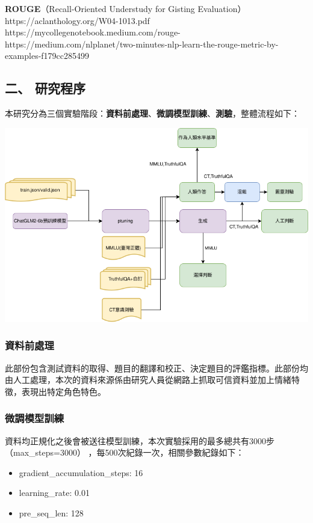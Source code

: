 \documentclass[8pt,a4paper,新細明體,UTF8,natbib]{article}
\begin{document}
\begin{CJK*}{UTF8}{bsmi}
\begin{minipage}{.9\textwidth}
	\textbf{ROUGE}（Recall-Oriented Understudy for Gisting Evaluation）
	https://aclanthology.org/W04-1013.pdf
	https://mycollegenotebook.medium.com/rouge-%
	https://medium.com/nlplanet/two-minutes-nlp-learn-the-rouge-metric-by-examples-f179cc285499
	\end{minipage}%

	\subsection{二、 研究程序}
	本研究分為三個實驗階段：\textbf{資料前處理}、\textbf{微調模型訓練}、\textbf{測驗}，整體流程如下：
	
	\includegraphics[width=\textwidth]{flowofstudy}%
	\subsubsection{資料前處理}
	此部份包含測試資料的取得、題目的翻譯和校正、決定題目的評鑑指標。此部份均由人工處理，本次的資料來源係由研究人員從網路上抓取可信資料並加上情緒特徵，表現出特定角色特色。
	\subsubsection{微調模型訓練}
	資料均正規化之後會被送往模型訓練，本次實驗採用的最多總共有3000步（max\_steps=3000） ，每500次紀錄一次，相關參數紀錄如下：
	\begin{itemize}
		\item gradient\_accumulation\_steps: 16
		\item learning\_rate: 0.01
		\item pre\_seq\_len: 128
	\end{itemize}

\end{CJK*}
\end{document}
